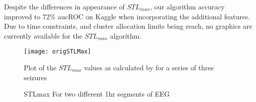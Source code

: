 Despite the differences in appearance of $STL_{max}$, our algorithm accuracy improved to 72\% aucROC on Kaggle when incorporating the additional features.  Due to time constraints, and cluster allocation limits being reach, no graphics are currently available for the $STL_{max}$ algorithm.

\begin{figure}[!t]
\centering
  \texttt{[image: origSTLMax]}
  \caption{Plot of the $STL_{max}$ values as calculated by \cite{iasemidis05} for a series of three seizures} \label{fig:origSTLMax}
\end{figure}

\begin{figure}[!t]
  \caption{STLmax For two different 1hr segments of EEG} \label{fig:STLMax}
\end{figure}
